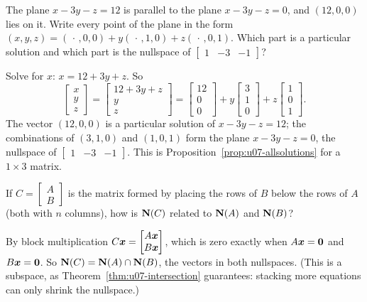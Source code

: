 \begin{exercise}\label{ex:u07-plane}
The plane $x-3y-z=12$ is parallel to the plane $x-3y-z=0$, and $(12,0,0)$ lies on it. Write
every point of the plane in the form
$(x,y,z)=(\,\cdot\,,0,0)+y(\,\cdot\,,1,0)+z(\,\cdot\,,0,1)$. Which part is a particular solution
and which part is the nullspace of $\begin{bmatrix} 1&-3&-1\end{bmatrix}$?
\end{exercise}
\begin{solution}
Solve for $x$: $x=12+3y+z$. So
\[
  \begin{bmatrix} x\\ y\\ z\end{bmatrix}=\begin{bmatrix} 12+3y+z\\ y\\ z\end{bmatrix}
  =\begin{bmatrix} 12\\ 0\\ 0\end{bmatrix}+y\begin{bmatrix} 3\\ 1\\ 0\end{bmatrix}
   +z\begin{bmatrix} 1\\ 0\\ 1\end{bmatrix}.
\]
The vector $(12,0,0)$ is a particular solution of $x-3y-z=12$; the combinations of $(3,1,0)$
and $(1,0,1)$ form the plane $x-3y-z=0$, the nullspace of $\begin{bmatrix} 1&-3&-1\end{bmatrix}$.
This is Proposition~\ref{prop:u07-allsolutions} for a $1\times3$ matrix.
\end{solution}

\begin{exercise}\label{ex:u07-stack}
If $C=\begin{bmatrix} A\\ B\end{bmatrix}$ is the matrix formed by placing the rows of $B$ below
the rows of $A$ (both with $n$ columns), how is $\mathbf{N}(C)$ related to $\mathbf{N}(A)$ and $\mathbf{N}(B)$?
\end{exercise}
\begin{solution}
By block multiplication $C\boldsymbol{x}=\begin{bmatrix} A\boldsymbol{x}\\ B\boldsymbol{x}\end{bmatrix}$, which is zero
exactly when $A\boldsymbol{x}=\boldsymbol{0}$ and $B\boldsymbol{x}=\boldsymbol{0}$. So $\mathbf{N}(C)=\mathbf{N}(A)\cap\mathbf{N}(B)$, the
vectors in both nullspaces. (This is a subspace, as Theorem~\ref{thm:u07-intersection}
guarantees: stacking more equations can only shrink the nullspace.)
\end{solution}

